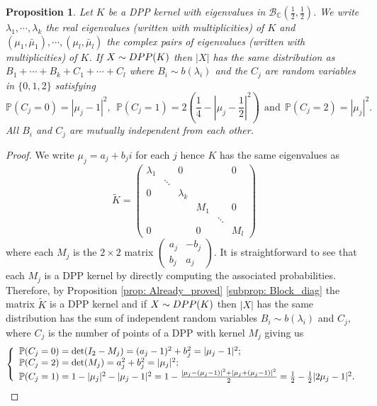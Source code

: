 \documentclass{article}
\numberwithin{equation}{section}
\renewcommand{\tilde}{\widetilde}
\newcommand{\DPP}{\textnormal{DPP}}
\theoremstyle{plain}
\newtheorem{proposition}{Proposition}[section]
\begin{document}
\begin{proposition}\label{prop: Dist_number_point_2}
Let $K$ be a DPP kernel with eigenvalues in $\mathcal{B}_\mathbb{C}\left(\frac 1 2, \frac 1 2\right)$. We write $\lambda_1,\cdots,\lambda_k$ the real eigenvalues (written with multiplicities) of $K$ and $(\mu_1,\bar\mu_1),\cdots,(\mu_l,\bar\mu_l)$ the complex pairs of eigenvalues (written with multiplicities) of $K$. If $X\sim\DPP(K)$ then $|X|$ has the same distribution as $B_1+\cdots+B_k+C_1+\cdots+C_l$ where $B_i\sim b(\lambda_i)$ and the $C_j$ are random variables in $\{0, 1, 2\}$ satisfying
\[\mathbb{P}(C_j=0)=|\mu_j-1|^2,~~\mathbb{P}(C_j=1)=2\left(\frac 1 4 - \left|\mu_j - \frac 1 2\right|^2\right)~~\mbox{and}~~\mathbb{P}(C_j=2)=|\mu_j|^2.\]
All $B_i$ and $C_j$ are mutually independent from each other.
\end{proposition}
\begin{proof}
We write $\mu_j=a_j+b_ji$ for each $j$ hence $K$ has the same eigenvalues as
\[\tilde K=\begin{pmatrix} \lambda_1 & & 0 & & & 0 \\
& \ddots & & & &\\
0 & & \lambda_k & & &\\
& & & M_1 & & 0\\
& & & & \ddots & \\
0 & & & 0 & & M_l
\end{pmatrix}\]
where each $M_j$ is the $2\times 2$ matrix $\begin{pmatrix} a_j & -b_j \\ b_j & a_j\end{pmatrix}$. It is straightforward to see that each $M_j$ is a DPP kernel by directly computing the associated probabilities. Therefore, by Proposition \ref{prop: Already_proved} \ref{subprop: Block_diag} the matrix $\tilde K$ is a DPP kernel and if $X\sim \DPP(K)$ then $|X|$ has the same distribution has the sum of independent random variables $B_i\sim b(\lambda_i)$ and $C_j$, where $C_j$ is the number of points of a DPP with kernel $M_j$ giving us
\begin{equation*}
\left\{\begin{array}{l}
\mathbb{P}(C_j=0)=\det(I_2-M_j)=(a_j-1)^2+b_j^2=|\mu_j-1|^2;\\
\mathbb{P}(C_j=2)=\det(M_j)=a_j^2+b_j^2=|\mu_j|^2;\\
\mathbb{P}(C_j=1)=1-|\mu_j|^2-|\mu_j-1|^2=1-\frac{|\mu_j-(\mu_j-1)|^2+|\mu_j+(\mu_j-1)|^2}{2}=\frac{1}{2}-\frac{1}{2}|2\mu_j-1|^2.
\end{array}\right.\qedhere
\end{equation*}
\end{proof}
\end{document}
